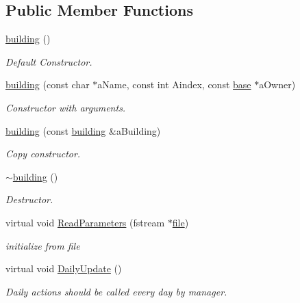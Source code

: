 \subsection*{Public Member Functions}
\begin{DoxyCompactItemize}
\item 
\hyperlink{classbuilding_ad342a61b9663079befc52c7100929d96}{building} ()
\begin{DoxyCompactList}\small\item\em Default Constructor. \item\end{DoxyCompactList}\item 
\hyperlink{classbuilding_aa73aea14fd1e7e2952f760fe84f098c3}{building} (const char $\ast$aName, const int Aindex, const \hyperlink{classbase}{base} $\ast$aOwner)
\begin{DoxyCompactList}\small\item\em Constructor with arguments. \item\end{DoxyCompactList}\item 
\hyperlink{classbuilding_aef43740bc60aed8365e98539fcc3007d}{building} (const \hyperlink{classbuilding}{building} \&aBuilding)
\begin{DoxyCompactList}\small\item\em Copy constructor. \item\end{DoxyCompactList}\item 
\hyperlink{classbuilding_a95a0fbd3ebfdd2077e7d8588bf7931ee}{$\sim$building} ()
\begin{DoxyCompactList}\small\item\em Destructor. \item\end{DoxyCompactList}\item 
virtual void \hyperlink{classbuilding_a5649b5598b63c3a4cf7a4e6e7d452d5d}{ReadParameters} (fstream $\ast$\hyperlink{classbase_a3af52ee9891719d09b8b19b42450b6f6}{file})
\begin{DoxyCompactList}\small\item\em initialize from file \item\end{DoxyCompactList}\item 
virtual void \hyperlink{classbuilding_a584ba300427d2a648f478b68065b7a18}{DailyUpdate} ()
\begin{DoxyCompactList}\small\item\em Daily actions should be called every day by manager. \item\end{DoxyCompactList}\item 

\end{DoxyCompactItemize}
